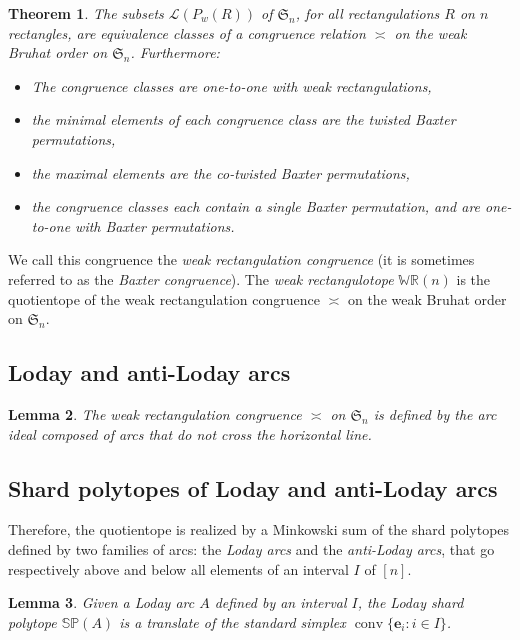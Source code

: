 \documentclass{amsart}
\newtheorem{theorem}{Theorem}%
\newtheorem{lemma}[theorem]{Lemma}
\theoremstyle{definition}
\newcommand{\f}[1]{\mathfrak{#1}} %
\DeclareMathOperator{\conv}{conv} %
\newcommand{\darkblue}{\color{darkblue}} %
\newcommand{\defn}[1]{\textsl{\darkblue #1}} %
\newcommand{\polytope}[1]{\mathds{#1}} %
\newcommand{\WRP}{\polytope{WR}} %
\newcommand{\SP}{\polytope{SP}}
\newcommand{\baxtereq}{\asymp}%
\begin{document}
\begin{theorem}
  The subsets $\mathcal{L}(P_w(R))$ of $\f{S}_n$, for all rectangulations $R$ on $n$ rectangles, 
  are equivalence classes of a congruence relation $\baxtereq$ on the weak Bruhat order on $\f{S}_n$.
  Furthermore:
  \begin{itemize}
  \item The congruence classes are one-to-one with weak rectangulations,  
  \item the minimal elements of each congruence class are the twisted Baxter permutations,
  \item the maximal elements are the co-twisted Baxter permutations,
  \item the congruence classes each contain a single Baxter permutation, and are one-to-one with Baxter permutations.
  \end{itemize}
\end{theorem}

We call this congruence the \defn{weak rectangulation congruence} (it is sometimes referred to as the \defn{Baxter congruence}).
The \defn{weak rectangulotope} $\WRP(n)$ is the quotientope of the weak rectangulation congruence $\baxtereq$ on the weak Bruhat order on $\f{S}_n$.

\subsection{Loday and anti-Loday arcs}

\begin{lemma}
The weak rectangulation congruence $\baxtereq$ on $\f{S}_n$ is defined by the arc ideal composed of arcs that do not cross the horizontal line.
\end{lemma}


\subsection{Shard polytopes of Loday and anti-Loday arcs}

Therefore, the quotientope is realized by a Minkowski sum of the shard polytopes defined by two families of arcs: the \defn{Loday arcs} and the \defn{anti-Loday arcs}, that go respectively above and below all elements of an interval $I$ of $[n]$.

\begin{lemma}
  \label{lem:lodaysp}
  Given a Loday arc $A$ defined by an interval $I$, the Loday shard polytope $\SP(A)$ is a translate of the standard simplex $\conv \{ \mathbf{e}_i : i\in I \}$.
\end{lemma}
\end{document}
